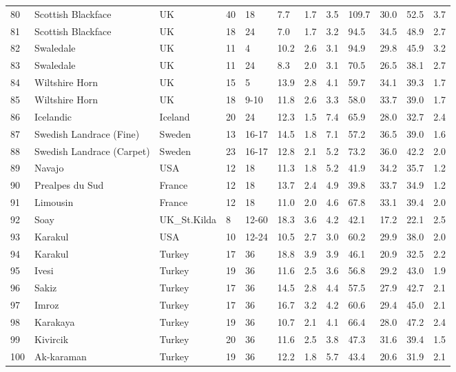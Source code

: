 \begin{center}
\begin{landscape}
\begin{longtable}{|p{0.4in}|p{0.9in}|p{0.7in}|p{0.4in}|p{0.45in}|p{0.45in}|p{0.45in}|p{0.45in}|p{0.45in}|p{0.45in}|p{0.45in}|p{0.45in}|}
 80 &  Scottish Blackface &  UK & 40 &  18 & 7.7 & 1.7 & 3.5 & 109.7 & 30.0 & 52.5 & 3.7 \\ 
 81 &  Scottish Blackface &  UK & 18 &  24 & 7.0 & 1.7 & 3.2 & 94.5 & 34.5 & 48.9 & 2.7 \\ 
 82 &  Swaledale &  UK & 11 &  4 & 10.2 & 2.6 & 3.1 & 94.9 & 29.8 & 45.9 & 3.2 \\ 
 83 &  Swaledale &  UK & 11 &  24 & 8.3 & 2.0 & 3.1 & 70.5 & 26.5 & 38.1 & 2.7 \\ 
 84 &  Wiltshire Horn &  UK & 15 &  5 & 13.9 & 2.8 & 4.1 & 59.7 & 34.1 & 39.3 & 1.7 \\ 
 85 &  Wiltshire Horn &  UK & 18 &  9-10 & 11.8 & 2.6 & 3.3 & 58.0 & 33.7 & 39.0 & 1.7 \\ 
 86 &  Icelandic &  Iceland & 20 &  24 & 12.3 & 1.5 & 7.4 & 65.9 & 28.0 & 32.7 & 2.4 \\ 
 87 &  Swedish Landrace (Fine) &  Sweden & 13 &  16-17 & 14.5 & 1.8 & 7.1 & 57.2 & 36.5 & 39.0 & 1.6 \\ 
 88 &  Swedish Landrace (Carpet) &  Sweden & 23 &  16-17 & 12.8 & 2.1 & 5.2 & 73.2 & 36.0 & 42.2 & 2.0 \\ 
 89 &  Navajo &  USA & 12 &  18 & 11.3 & 1.8 & 5.2 & 41.9 & 34.2 & 35.7 & 1.2 \\ 
 90 &  Prealpes du Sud &  France & 12 &  18 & 13.7 & 2.4 & 4.9 & 39.8 & 33.7 & 34.9 & 1.2 \\ 
 91 &  Limousin &  France & 12 &  18 & 11.0 & 2.0 & 4.6 & 67.8 & 33.1 & 39.4 & 2.0 \\ 
 92 &  Soay &  UK\_St.Kilda &  8 &  12-60 & 18.3 & 3.6 & 4.2 & 42.1 & 17.2 & 22.1 & 2.5 \\ 
 93 &  Karakul &  USA & 10 &  12-24 & 10.5 & 2.7 & 3.0 & 60.2 & 29.9 & 38.0 & 2.0 \\ 
 94 &  Karakul &  Turkey & 17 &  36 & 18.8 & 3.9 & 3.9 & 46.1 & 20.9 & 32.5 & 2.2 \\ 
 95 &  Ivesi &  Turkey & 19 &  36 & 11.6 & 2.5 & 3.6 & 56.8 & 29.2 & 43.0 & 1.9 \\ 
 96 &  Sakiz &  Turkey & 17 &  36 & 14.5 & 2.8 & 4.4 & 57.5 & 27.9 & 42.7 & 2.1 \\ 
 97 &  Imroz &  Turkey & 17 &  36 & 16.7 & 3.2 & 4.2 & 60.6 & 29.4 & 45.0 & 2.1 \\ 
 98 &  Karakaya &  Turkey & 19 &  36 & 10.7 & 2.1 & 4.1 & 66.4 & 28.0 & 47.2 & 2.4 \\ 
 99 &  Kivircik &  Turkey & 20 &  36 & 11.6 & 2.5 & 3.8 & 47.3 & 31.6 & 39.4 & 1.5 \\ 
 100 &  Ak-karaman &  Turkey & 19 &  36 & 12.2 & 1.8 & 5.7 & 43.4 & 20.6 & 31.9 & 2.1 \\ 

\end{longtable}
\end{landscape}
\end{center}
